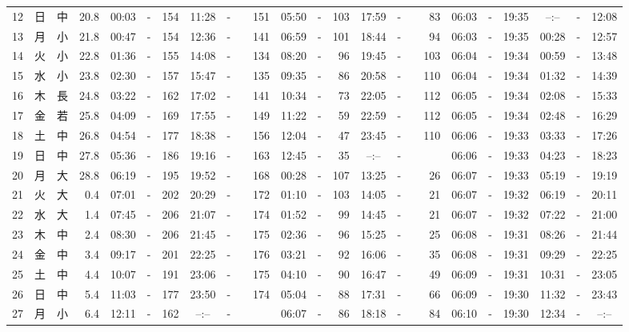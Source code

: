 \documentclass[12pt,a4j]{jsarticle}
\begin{document}
\begin{table}[htbp]
\begin{center}
{\begin{tabular}{|rc|cr|ccrccr|ccrccr|ccc|ccc|}
12 & 日 & 中 & 20.8 &  00:03 &-& 154 &  11:28 &-& 151 &  05:50 &-& 103 &  17:59 &-&  83 & 06:03 & -& 19:35 & --:-- & -& 12:08 \\
13 & 月 & 小 & 21.8 &  00:47 &-& 154 &  12:36 &-& 141 &  06:59 &-& 101 &  18:44 &-&  94 & 06:03 & -& 19:35 & 00:28 & -& 12:57 \\
14 & 火 & 小 & 22.8 &  01:36 &-& 155 &  14:08 &-& 134 &  08:20 &-&  96 &  19:45 &-& 103 & 06:04 & -& 19:34 & 00:59 & -& 13:48 \\
15 & 水 & 小 & 23.8 &  02:30 &-& 157 &  15:47 &-& 135 &  09:35 &-&  86 &  20:58 &-& 110 & 06:04 & -& 19:34 & 01:32 & -& 14:39 \\
16 & 木 & 長 & 24.8 &  03:22 &-& 162 &  17:02 &-& 141 &  10:34 &-&  73 &  22:05 &-& 112 & 06:05 & -& 19:34 & 02:08 & -& 15:33 \\
17 & 金 & 若 & 25.8 &  04:09 &-& 169 &  17:55 &-& 149 &  11:22 &-&  59 &  22:59 &-& 112 & 06:05 & -& 19:34 & 02:48 & -& 16:29 \\
18 & 土 & 中 & 26.8 &  04:54 &-& 177 &  18:38 &-& 156 &  12:04 &-&  47 &  23:45 &-& 110 & 06:06 & -& 19:33 & 03:33 & -& 17:26 \\
19 & 日 & 中 & 27.8 &  05:36 &-& 186 &  19:16 &-& 163 &  12:45 &-&  35 &  --:-- &-&~~~~~ & 06:06 & -& 19:33 & 04:23 & -& 18:23 \\
20 & 月 & 大 & 28.8 &  06:19 &-& 195 &  19:52 &-& 168 &  00:28 &-& 107 &  13:25 &-&  26 & 06:07 & -& 19:33 & 05:19 & -& 19:19 \\
21 & 火 & 大 &  0.4 &  07:01 &-& 202 &  20:29 &-& 172 &  01:10 &-& 103 &  14:05 &-&  21 & 06:07 & -& 19:32 & 06:19 & -& 20:11 \\
22 & 水 & 大 &  1.4 &  07:45 &-& 206 &  21:07 &-& 174 &  01:52 &-&  99 &  14:45 &-&  21 & 06:07 & -& 19:32 & 07:22 & -& 21:00 \\
23 & 木 & 中 &  2.4 &  08:30 &-& 206 &  21:45 &-& 175 &  02:36 &-&  96 &  15:25 &-&  25 & 06:08 & -& 19:31 & 08:26 & -& 21:44 \\
24 & 金 & 中 &  3.4 &  09:17 &-& 201 &  22:25 &-& 176 &  03:21 &-&  92 &  16:06 &-&  35 & 06:08 & -& 19:31 & 09:29 & -& 22:25 \\
25 & 土 & 中 &  4.4 &  10:07 &-& 191 &  23:06 &-& 175 &  04:10 &-&  90 &  16:47 &-&  49 & 06:09 & -& 19:31 & 10:31 & -& 23:05 \\
26 & 日 & 中 &  5.4 &  11:03 &-& 177 &  23:50 &-& 174 &  05:04 &-&  88 &  17:31 &-&  66 & 06:09 & -& 19:30 & 11:32 & -& 23:43 \\
27 & 月 & 小 &  6.4 &  12:11 &-& 162 &  --:-- &-&~~~~~ &  06:07 &-&  86 &  18:18 &-&  84 & 06:10 & -& 19:30 & 12:34 & -& --:-- \\

\end{tabular}}
\end{center}
\end{table}
\end{document}
